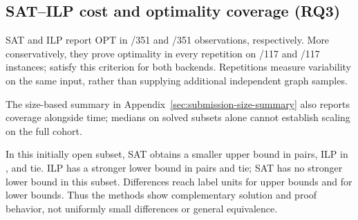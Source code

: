 \subsection{SAT--ILP cost and optimality coverage (RQ3)}
SAT and ILP report OPT in \ProgressSATOpt/351 and \ProgressILPOpt/351 observations, respectively.
More conservatively, they prove optimality in every repetition on
\ProgressSATStable/117 and \ProgressILPStable/117 instances;
\ProgressJointStable{} satisfy this criterion for both backends.
Repetitions measure variability on the same input, rather than supplying
additional independent graph samples.
\begin{table}[htbp]
\centering\small
\caption{Optimality coverage within 30 seconds.}
\label{tab:submission-coverage}

\end{table}


The size-based summary in Appendix~\ref{sec:submission-size-summary}
also reports coverage alongside time; medians on solved subsets alone
cannot establish scaling on the full cohort.

\begin{table}[htbp]
\centering\small
\caption{Paired lower- and upper-bound comparisons.}
\label{tab:submission-bounds}

\end{table}

In this initially open subset, SAT obtains a smaller upper bound in
\ProgressOpenSATUB{} pairs, ILP in \ProgressOpenILPUB{}, and
\ProgressOpenEqualUB{} tie. ILP has a stronger lower bound in
\ProgressOpenILPLB{} pairs and \ProgressOpenEqualLB{} tie; SAT has no
stronger lower bound in this subset. Differences reach
\ProgressMaxUB{} label units for upper bounds and \ProgressMaxLB{}
for lower bounds. Thus the methods show complementary solution and
proof behavior, not uniformly small differences or general equivalence.

